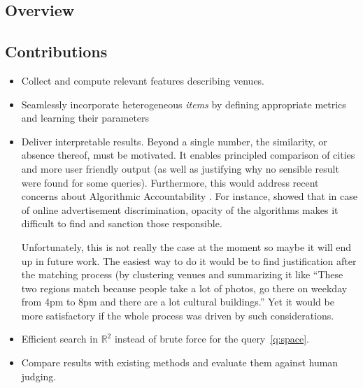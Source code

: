 \subsection{Overview}
\subsection{Contributions}

\begin{itemize}
	\item Collect and compute relevant features describing venues.
	\item Seamlessly incorporate heterogeneous \emph{items} by defining
		appropriate metrics and learning their parameters
	\item Deliver interpretable results. Beyond a single number, the
		similarity, or absence thereof, must be motivated. It enables
		principled comparison of cities and more user friendly output
		(as well as justifying why no sensible result were found for
		some queries). Furthermore, this would address recent
		concerns about Algorithmic Accountability
		\autocite{Accountability13}. For instance,
		\textcite{Discrimination13} showed that in case of online
		advertisement discrimination, opacity of the algorithms makes
		it difficult to find and sanction those responsible.
        \begin{comments}
            Unfortunately, this is not really the case at the moment so maybe
            it will end up in future work. The easiest way to do it would be
            to find justification after the matching process (by clustering
            venues and summarizing it like \enquote{These two regions match
            because people take a lot of photos, go there on weekday from
            4pm to 8pm and there are a lot cultural buildings.} Yet it would
            be more satisfactory if the whole process was driven by such
            considerations.
        \end{comments}
	\item Efficient search in $\mathbb{R}^2$ instead of brute force for
		the query~\ref{q:space}.
	\item Compare results with existing methods and evaluate them against
		human judging.
\end{itemize}
